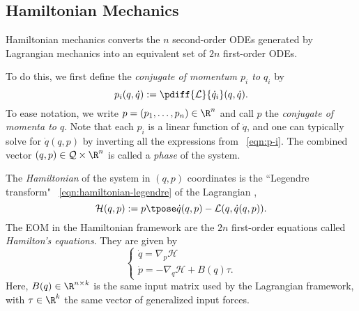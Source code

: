 \subsection{Hamiltonian Mechanics}
Hamiltonian mechanics converts the \(n\) second-order ODEs generated by
Lagrangian mechanics into an equivalent set of \(2n\) first-order ODEs.

To do this, we first define the \textit{conjugate of momentum \(p_i\) to \(q_i\)} by
\begin{equation}\label{eqn:p-i}
    p_i(q,\dot{q}) := \pdiff{\mathcal{L}}{\dot{q}_i}(q,\dot{q})
    .
\end{equation}
To ease notation, we write \(p = (p_1, \ldots, p_n) \in \R^n\) and call
\(p\) the \textit{conjugate of momenta to \(q\)}.
Note that each \(p_i\) is a linear function of \(\dot{q}\), and one can typically
solve for \(\dot{q}(q,p)\) by inverting all the expressions from ~\eqref{eqn:p-i}.
The combined vector \((q,p) \in \mathcal{Q}\times\R^n\) is called a 
\textit{phase} of the system. 

The \textit{Hamiltonian} of the system in
\((q,p)\) coordinates is the ``Legendre transform"
~\eqref{eqn:hamiltonian-legendre} of the Lagrangian \cite{landau_mechanics},
\begin{equation}\label{eqn:hamiltonian-legendre}
    \mathcal{H}(q,p) := p\tpose \dot{q}(q,p) - \mathcal{L}(q,\dot{q}(q,p))
    .
\end{equation}
The EOM in the Hamiltonian framework are the \(2n\)
first-order equations called \textit{Hamilton's equations}. They are given by
\begin{equation}\label{eqn:hamiltons-eqns}
    \begin{cases}
        \dot{q} = \nabla_p\mathcal{H} \\
        \dot{p} = -\nabla_q\mathcal{H} + B(q)\tau
        .
    \end{cases}
\end{equation}
Here, \(B(q) \in \R^{n\times k}\) is the same input matrix used by the
Lagrangian framework, with \(\tau \in \R^k\) the same vector of generalized
input forces.

